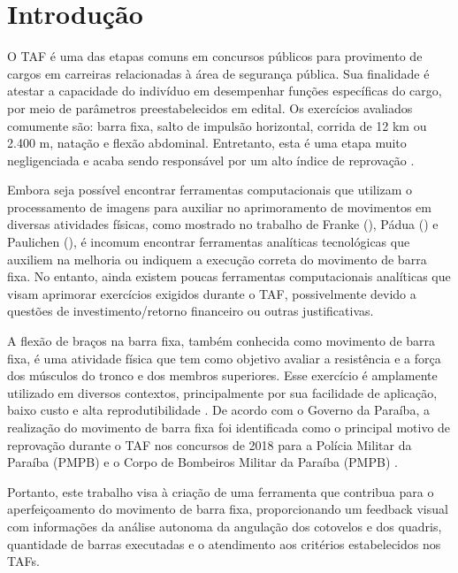 \chapter{Introdução}


O \ac{TAF} é uma das etapas comuns em concursos públicos para provimento de cargos em carreiras relacionadas à área de segurança pública. Sua finalidade é atestar a capacidade do indivíduo em desempenhar funções específicas do cargo, por meio de parâmetros preestabelecidos em edital. Os exercícios avaliados comumente são: barra fixa, salto de impulsão horizontal, corrida de 12 km ou 2.400 m, natação e flexão abdominal. Entretanto, esta é uma etapa muito negligenciada e acaba sendo responsável por um alto índice de reprovação \cite{reprovaTAF}.

Embora seja possível encontrar ferramentas computacionais que utilizam o processamento de imagens para auxiliar no aprimoramento de movimentos em diversas atividades físicas, como mostrado no trabalho de Franke (\citeyear{vcBicicleta}), Pádua (\citeyear{vcFutebol}) e Paulichen (\citeyear{futebolTatica}), é incomum encontrar ferramentas analíticas tecnológicas que auxiliem na melhoria ou indiquem a execução correta do movimento de barra fixa. No entanto, ainda existem poucas ferramentas computacionais analíticas que visam aprimorar exercícios exigidos durante o \ac{TAF}, possivelmente devido a questões de investimento/retorno financeiro ou outras justificativas.

A flexão de braços na barra fixa, também conhecida como movimento de barra fixa, é uma atividade física que tem como objetivo avaliar a resistência e a força dos músculos do tronco e dos membros superiores. Esse exercício é amplamente utilizado em diversos contextos, principalmente por sua facilidade de aplicação, baixo custo e alta reprodutibilidade \cite{barraFixa}. De acordo com o Governo da Paraíba, a realização do movimento de barra fixa foi identificada como o principal motivo de reprovação durante o \ac{TAF} nos concursos de 2018 para a Polícia Militar da Paraíba (PMPB) e o Corpo de Bombeiros Militar da Paraíba (PMPB) \cite{barraTAF}.

Portanto, este trabalho visa à criação de uma ferramenta que contribua para o aperfeiçoamento do movimento de barra fixa, proporcionando um feedback visual com informações da análise autonoma da angulação dos cotovelos e dos quadris, quantidade de barras executadas e o atendimento aos critérios estabelecidos nos \ac{TAF}s.
